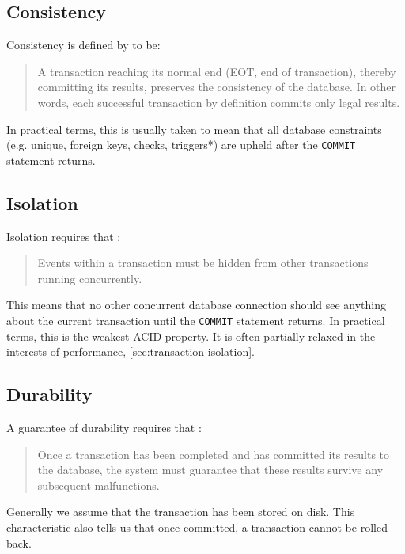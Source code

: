 \subsection{Consistency}
\label{sec:consistency}

Consistency is defined by \citet{haerder:1983:principles} to be:
\begin{quotation}
  A transaction reaching its normal end (EOT, end of transaction), thereby committing its results, preserves the consistency of the database.
  In other words, each successful transaction by definition commits only legal results.
\end{quotation}

In practical terms, this is usually taken to mean that all database constraints (e.g. unique, foreign keys, checks, triggers*) are upheld after the \texttt{COMMIT} statement returns.

\subsection{Isolation} 
\label{sec:isolation}

Isolation requires that \citep{haerder:1983:principles}:
\begin{quotation}
  Events within a transaction must be hidden from other transactions running concurrently.
\end{quotation}
This means that no other concurrent database connection should see anything about the current transaction until the \texttt{COMMIT} statement returns.
In practical terms, this is the weakest ACID property.
It is often partially relaxed in the interests of performance, \autoref{sec:transaction-isolation}.

\subsection{Durability} 
\label{sec:durability}

A guarantee of durability requires that \citep{haerder:1983:principles}:
\begin{quotation}
Once a transaction has been completed and has committed its results to the database, the system must guarantee that these results survive any subsequent malfunctions.
\end{quotation}
Generally we assume that the transaction has been stored on disk. 
This characteristic also tells us that once committed, a transaction cannot be rolled back.



